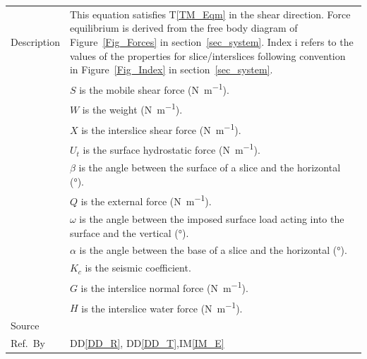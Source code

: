 \documentclass[12pt]{article}
\newcommand{\colAwidth}{0.13\textwidth}
\newcommand{\colBwidth}{0.82\textwidth}
\newcommand{\tref}[1]{T\ref{#1}}
\newcommand{\iref}[1]{IM\ref{#1}}
\newcommand{\ddref}[1]{DD\ref{#1}}
\begin{document}
\begin{minipage}{\textwidth}
\begin{tabular}{| p{\colAwidth} | p{\colBwidth}|}
  \hline Description & This equation satisfies \tref{TM_Eqm} in the shear 
  direction. Force equilibrium is derived from the free body diagram of 
  Figure~\ref{Fig_Forces} in section~\ref{sec_system}. Index $\text{i}$ refers 
  to the values of the properties for slice/interslices following convention in
  Figure~\ref{Fig_Index} in section~\ref{sec_system}.\\
  &$S$ is the mobile shear force (\si{\newton\per\meter}). \\
  &$W$ is the weight (\si{\newton\per\meter}). \\
  &$X$ is the interslice shear force (\si{\newton\per\meter}). \\
  &$U_t$ is the surface hydrostatic force (\si{\newton\per\meter}). \\
  &$\beta$ is the angle between the surface of a slice and the 
  horizontal (\si{\degree}). \\
  &$Q$ is the external force (\si{\newton\per\meter}). \\
  &$\omega$ is the angle between the imposed surface load acting into 
  the surface and the vertical (\si{\degree}). \\
  &$\alpha$ is the angle between the base of a slice and the 
  horizontal (\si{\degree}). \\
  &$K_c$ is the seismic coefficient. \\
  &$G$ is the interslice normal force (\si{\newton\per\meter}). \\
  &$H$ is the interslice water force (\si{\newton\per\meter}). \\

  \hline Source & \cite{ZhuEtAl2005}\\
  
  \hline Ref.\ By & \ddref{DD_R}, \ddref{DD_T},\iref{IM_E}\\
  
  \hline
\end{tabular}
\end{minipage}\\

~\newline
\end{document}
